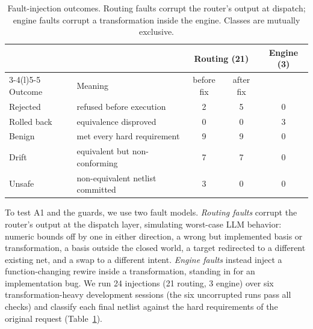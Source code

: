 \documentclass[conference,letterpaper]{IEEEtran}
\begin{document}
\begin{table}[t]
\caption{Fault-injection outcomes. Routing faults corrupt the router's output
at dispatch; engine faults corrupt a transformation inside the engine. Classes
are mutually exclusive.}
\label{tab:fault}
\centering
\footnotesize
\setlength{\tabcolsep}{3pt}
\begin{tabularx}{\columnwidth}{@{}l>{\raggedright\arraybackslash}Xccc@{}}
\toprule
 & & \multicolumn{2}{c}{Routing (21)} & Engine (3) \\
\cmidrule(lr){3-4}\cmidrule(l){5-5}
Outcome & Meaning & before fix & after fix & \\
\midrule
Rejected & refused before execution & 2 & 5 & 0 \\
Rolled back & equivalence disproved & 0 & 0 & 3 \\
Benign & met every hard requirement & 9 & 9 & 0 \\
Drift & equivalent but non-conforming & 7 & 7 & 0 \\
Unsafe & non-equivalent netlist committed & 3 & 0 & 0 \\
\bottomrule
\end{tabularx}
\end{table}

To test A1 and the guards, we use two fault models. \emph{Routing faults}
corrupt the router's output at the dispatch layer, simulating worst-case LLM
behavior: numeric bounds off by one in either direction, a wrong but
implemented basis or transformation, a basis outside the closed world, a
target redirected to a different existing net, and a swap to a different
intent. \emph{Engine faults} instead inject a function-changing rewire inside
a transformation, standing in for an implementation bug. We run 24 injections
(21 routing, 3 engine) over six transformation-heavy development sessions (the six
uncorrupted runs pass all checks) and classify each final netlist against the
hard requirements of the original request (Table~\ref{tab:fault}).
\end{document}
